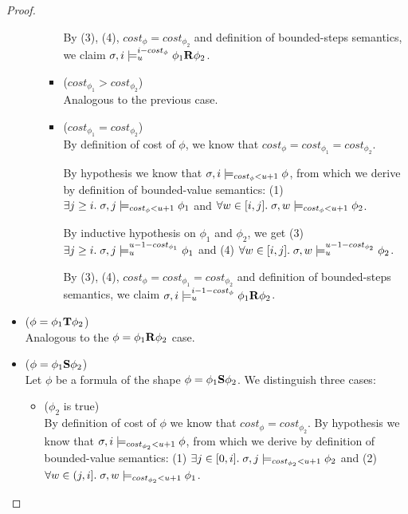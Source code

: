 \begin{theorem}
\begin{lemma}
\begin{proof}
\begin{itemize}
\begin{itemize}
\begin{itemize}
            By (3), (4), $cost_\phi = cost_{\phi_2}$ and definition of bounded-steps semantics, we claim $\sigma, i \models_{u}^{i-cost_\phi} \phi_1 \mathbf{R} \phi_2$.

            \item ($cost_{\phi_1} > cost_{\phi_2}$) \\
            Analogous to the previous case.

            \item ($cost_{\phi_1} = cost_{\phi_2}$) \\
            By definition of cost of $\phi$, we know that $cost_\phi = cost_{\phi_1} = cost_{\phi_2}$.

            By hypothesis we know that $\sigma, i \models_{cost_\phi < u + 1} \phi$, from which we derive by definition of bounded-value semantics: (1) $\exists j \geq i.\; \sigma,j \models_{cost_\phi < u + 1} \phi_1$ and $\forall w \in [i,j].\; \sigma,w \models_{cost_\phi < u + 1} \phi_2$.

            By inductive hypothesis on $\phi_1$ and $\phi_2$, we get (3) $\exists j \geq i.\; \sigma,j \models_{u}^{u-1-cost_{\phi_1}} \phi_1$ and (4) $\forall w \in [i,j].\; \sigma,w \models_{u}^{u-1-cost_{\phi_2}} \phi_2$.

            By (3), (4), $cost_\phi = cost_{\phi_1} = cost_{\phi_2}$ and definition of bounded-steps semantics, we claim $\sigma, i \models_{u}^{i-1-cost_\phi} \phi_1 \mathbf{R} \phi_2$.
        \end{itemize}
    \end{itemize}
    
    \item ($\phi = \phi_1 \mathbf{T} \phi_2$) \\
    Analogous to the $\phi = \phi_1 \mathbf{R} \phi_2$ case.

    \item ($\phi = \phi_1 \mathbf{S} \phi_2$) \\
    Let $\phi$ be a formula of the shape $\phi = \phi_1 \mathbf{S} \phi_2$.
    We distinguish three cases:
    \begin{itemize}
        \item ($\phi_2$ is true) \\
        By definition of cost of $\phi$ we know that $cost_\phi = cost_{\phi_2}$.
        By hypothesis we know that $\sigma, i \models_{cost_{\phi_2} < u + 1} \phi$, from which we derive by definition of bounded-value semantics: (1) $\exists j \in [0,i].\; \sigma,j \models_{cost_{\phi_2} < u + 1} \phi_2$ and (2) $\forall w \in (j,i].\; \sigma,w \models_{cost_{\phi_2} < u + 1} \phi_1$.


\end{itemize}
\end{itemize}
\end{proof}
\end{lemma}
\end{theorem}
